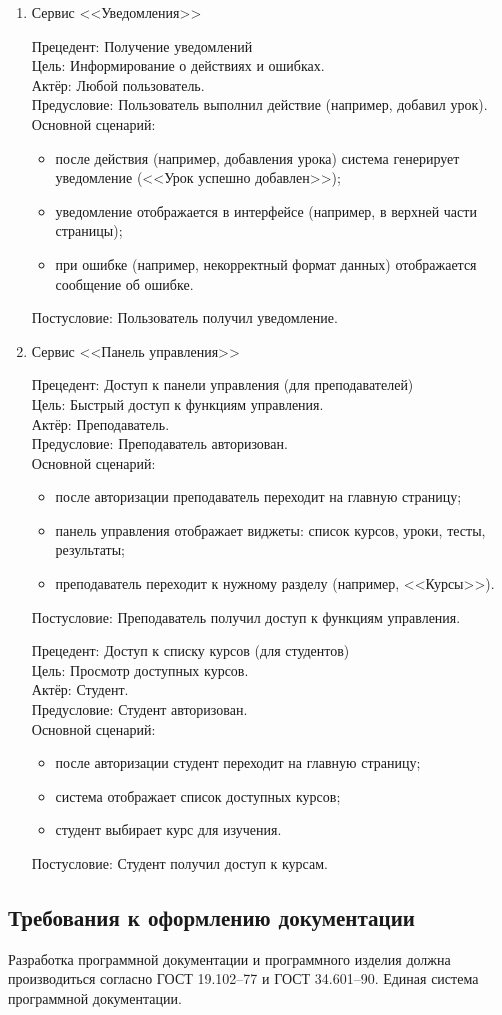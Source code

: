 \begin{enumerate}
	\item {Сервис <<Уведомления>>}
	
	{Прецедент: Получение уведомлений} \\
	{Цель}: Информирование о действиях и ошибках. \\
	{Актёр}: Любой пользователь. \\
	{Предусловие}: Пользователь выполнил действие (например, добавил урок). \\
	{Основной сценарий}:
	\begin{itemize}
		\item после действия (например, добавления урока) система генерирует уведомление (<<Урок успешно добавлен>>);
		\item уведомление отображается в интерфейсе (например, в верхней части страницы);
		\item при ошибке (например, некорректный формат данных) отображается сообщение об ошибке.
	\end{itemize}
	{Постусловие}: Пользователь получил уведомление.
	
	\item {Сервис <<Панель управления>>}
	
	{Прецедент: Доступ к панели управления (для преподавателей)} \\
	{Цель}: Быстрый доступ к функциям управления. \\
	{Актёр}: Преподаватель. \\
	{Предусловие}: Преподаватель авторизован. \\
	{Основной сценарий}:
	\begin{itemize}
		\item после авторизации преподаватель переходит на главную страницу;
		\item панель управления отображает виджеты: список курсов, уроки, тесты, результаты;
		\item преподаватель переходит к нужному разделу (например, <<Курсы>>).
	\end{itemize}
	{Постусловие}: Преподаватель получил доступ к функциям управления.
	
	{Прецедент: Доступ к списку курсов (для студентов)} \\
	{Цель}: Просмотр доступных курсов. \\
	{Актёр}: Студент. \\
	{Предусловие}: Студент авторизован. \\
	{Основной сценарий}:
	\begin{itemize}
		\item после авторизации студент переходит на главную страницу;
		\item система отображает список доступных курсов;
		\item студент выбирает курс для изучения.
	\end{itemize}
	{Постусловие}: Студент получил доступ к курсам.
\end{enumerate}

\subsection{Требования к оформлению документации}

Разработка программной документации и программного изделия должна производиться согласно ГОСТ 19.102–77 и ГОСТ 34.601–90. Единая система программной документации.
